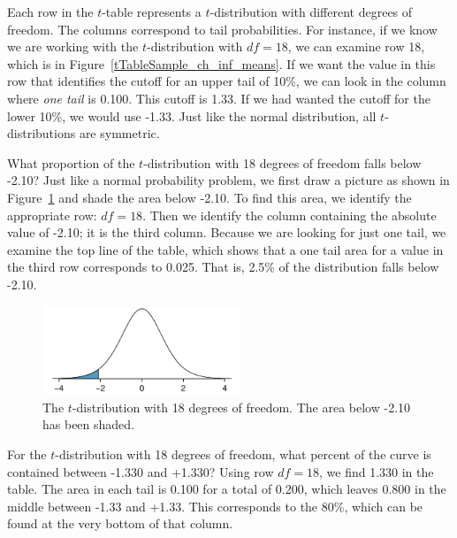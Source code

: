 Each row in the $t$-table represents a $t$-distribution with different degrees of freedom. The columns correspond to tail probabilities. For instance, if we know we are working with the $t$-distribution with $df=18$, we can examine row 18, which is  in Figure~\ref{tTableSample_ch_inf_means}. If we want the value in this row that identifies the cutoff for an upper tail of 10\%, we can look in the column where \emph{one tail} is 0.100. This cutoff is 1.33. If we had wanted the cutoff for the lower 10\%, we would use -1.33. Just like the normal distribution, all $t$-distributions are symmetric.


\begin{examplewrap}
\begin{nexample}{What proportion of the $t$-distribution with 18 degrees of freedom falls below -2.10?}
Just like a normal probability problem, we first draw a picture as shown in Figure~\ref{tDistDF18LeftTail2Point10} and shade the area below -2.10. To find this area, we identify the appropriate row: $df=18$. Then we identify the column containing the absolute value of -2.10; it is the third column. Because we are looking for just one tail, we examine the top line of the table, which shows that a one tail area for a value in the third row corresponds to 0.025. That is, 2.5\% of the distribution falls below -2.10.
\end{nexample}
\end{examplewrap}

\begin{figure}
\centering
\includegraphics[width=0.53\textwidth]{ch_inference_for_means/figures/tDistDF18LeftTail2Point10/tDistDF18LeftTail2Point10}
\caption{The $t$-distribution with 18 degrees of freedom. The area below -2.10 has been shaded.}
\label{tDistDF18LeftTail2Point10}
\end{figure}


\begin{examplewrap}
\begin{nexample}{For the $t$-distribution with 18 degrees of freedom, what percent of the curve is contained between -1.330 and +1.330?}
Using row $df = 18$, we find 1.330 in the table. The area in each tail is 0.100 for a total of 0.200, which leaves 0.800 in the middle between -1.33 and +1.33. This corresponds to the 80\%, which can be found at the very bottom of that  column.  
\end{nexample}
\end{examplewrap}

